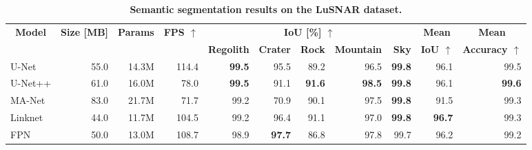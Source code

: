 \begin{table*}[h]
	\centering
	\caption{\bfseries Semantic segmentation results on the LuSNAR dataset.}
	\label{tab:semantic_segmentation_models}
	\small
	\begin{tabular}{|l rrrrrrrrrr|}
		\hline
		\multicolumn{1}{|c}{\multirow{2}{*}{\textbf{Model}}}         &
		\multicolumn{1}{c}{\multirow{2}{*}{\textbf{Size [MB]}}}      &
		\multicolumn{1}{c}{\multirow{2}{*}{\textbf{Params}}}         &
		\multicolumn{1}{c}{\multirow{2}{*}{\textbf{FPS $\uparrow$}}} &
		\multicolumn{5}{c}{\textbf{IoU [\%] $\uparrow$}}             &
		\multicolumn{1}{c}{\textbf{Mean}}                            &
		\multicolumn{1}{c|}{\textbf{Mean}}
		\\
		\cmidrule{4-7}
		                                                             &              &               &                &
		\textbf{Regolith}                                            &
		\textbf{Crater}                                              &
		\textbf{Rock}                                                &
		\textbf{Mountain}                                            &
		\textbf{Sky}                                                 &
		\multicolumn{1}{c}{\textbf{IoU $\uparrow$}}                  &
		\multicolumn{1}{c|}{\textbf{Accuracy $\uparrow$}}
		\\
		\hline
		\hline
		U-Net                                                        & 55.0         & 14.3M         & 114.4          & \textbf{99.5} & 95.5          & 89.2          & 96.5          & \textbf{99.8} & 96.1          & 99.5          \\
		U-Net++                                                      & 61.0         & 16.0M         & 78.0           & \textbf{99.5} & 91.1          & \textbf{91.6} & \textbf{98.5} & \textbf{99.8} & 96.1          & \textbf{99.6} \\
		MA-Net                                                       & 83.0         & 21.7M         & 71.7           & 99.2          & 70.9          & 90.1          & 97.5          & \textbf{99.8} & 91.5          & 99.3          \\
		Linknet                                                      & 44.0         & 11.7M         & 104.5          & 99.2          & 96.4          & 91.1          & 97.0          & \textbf{99.8} & \textbf{96.7} & 99.3          \\
		FPN                                                          & 50.0         & 13.0M         & 108.7          & 98.9          & \textbf{97.7} & 86.8          & 97.8          & 99.7          & 96.2          & 99.2          \\

\end{tabular}
\end{table*}
